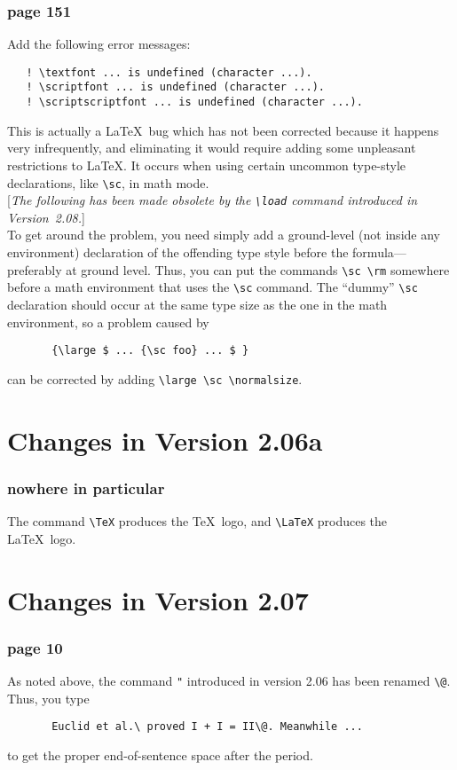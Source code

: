 \subsubsection*{page 151}
Add the following error messages:
\begin{verbatim}
   ! \textfont ... is undefined (character ...).
   ! \scriptfont ... is undefined (character ...).
   ! \scriptscriptfont ... is undefined (character ...).
\end{verbatim}
This is actually a \LaTeX\ bug which has not been corrected because it
happens very infrequently, and eliminating it would require adding some
unpleasant restrictions to \LaTeX.  It occurs when using certain
uncommon type-style declarations, like \hbox{\verb"\sc"}, in math
mode.\\
{[}{\it The following has been made obsolete by the
\hbox{\verb|\load|} command introduced in Version~2.08.}]\\
To get around the problem, you need simply add a ground-level
(not inside any environment) declaration of the offending type style
before the formula---preferably at ground level.  Thus, you can
put the commands \hbox{\verb"\sc \rm"} somewhere before a math environment
that uses the \hbox{\verb"\sc"} command.   The ``dummy'' \hbox{\verb"\sc"}
declaration should occur at the same type size as the one in the
math environment, so a problem caused by
\begin{verbatim}
       {\large $ ... {\sc foo} ... $ }
\end{verbatim}
can be corrected by adding \hbox{\verb"\large \sc \normalsize"}.

\section*{Changes in Version 2.06a}

\subsubsection* {nowhere in particular}
The command \hbox{\verb"\TeX"} produces the \TeX\  logo, and
\hbox{\verb"\LaTeX"} produces the \LaTeX\ logo.


\section*{Changes in Version 2.07}

\subsubsection*{page 10}
As noted above, the command \verb|"| introduced in version 2.06 has
been renamed \verb|\@|.  Thus, you type
\begin{verbatim}
       Euclid et al.\ proved I + I = II\@. Meanwhile ...
\end{verbatim}
to get the proper end-of-sentence space after the period.

